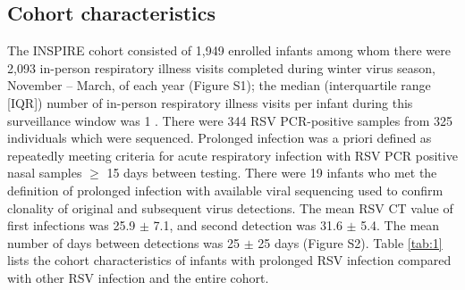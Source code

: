 \documentclass{article} %
\begin{document}
\subsection{Cohort characteristics}
The INSPIRE cohort consisted of 1,949 enrolled infants among whom there were 2,093 in-person respiratory illness visits completed during winter virus season, November – March, of each year (Figure S1); the median (interquartile range [IQR]) number of in-person respiratory illness visits per infant during this surveillance window was 1 
\citep{lawless2020genome, hall_burden_2009}.
There were 344 RSV PCR-positive samples from 325 individuals which were sequenced. 
Prolonged infection was a priori defined as repeatedly meeting criteria for acute respiratory infection with RSV PCR positive nasal samples $\ge$ 15 days between testing. 
There were 19 infants who met the definition of prolonged infection with available viral sequencing used to confirm clonality of original and subsequent virus detections. 
The mean RSV CT value of first infections was 25.9 $\pm$ 7.1, and second detection was 31.6 $\pm$ 5.4. 
The mean number of days between detections was 25 $\pm$ 25 days (Figure S2). Table \ref{tab:1} lists the cohort characteristics of infants with prolonged RSV infection compared with other RSV infection and the entire cohort.
 
\end{document}
